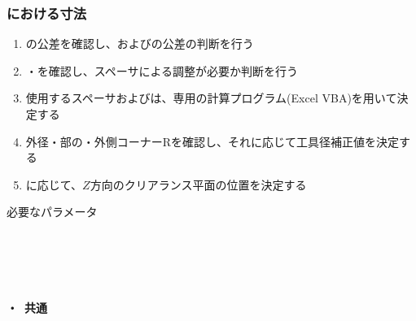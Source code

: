 \subsubsection{\EndFacecut における寸法}
\begin{enumerate}[label=\sarrow]
\item {}\nameWorkTotalLength の公差を確認し、\TopAlocationLength および\BottomAlocationLength の公差の判断を行う
\item \TopAlocationLength・\BottomAlocationLength を確認し、スペーサによる調整が必要か判断を行う
\item 使用するスペーサおよび\ReAlocationLength は、専用の計算プログラム(Excel VBA)を用いて決定する
\item {}外径・\nameEndFace 部の\nameThickness・\nameEndFace 外側コーナーRを確認し、それに応じて工具径補正値を決定する
\item \ReAlocationLength に応じて、$Z$方向のクリアランス平面の位置を決定する
\end{enumerate}
\begin{Parameter}{必要なパラメータ}
\paragraph*{\ReAlocationLength}
\PMWorkTotalLength
\PMTopAlocationLength
\PMBottomAlocationLength
\PMACOD
\PMJigLength
{}
\tcbline*
\paragraph*{\TopEndFacecut}
\PMTopReAlocationLength
\PMACOD
\PMBDOD
\PMODCornerR\\
\PMTopEndACID
\PMTopEndBDID
{}
\tcbline*
\paragraph*{\BottomEndFacecut}
\PMBottomReAlocationLength
\PMACOD
\PMBDOD
\PMODCornerR\\
\PMBottomEndACID
\PMBottomEndBDID
{}
\tcbline*
\paragraph*{\TopEndFacecut・\BottomEndFacecut~共通}
\end{Parameter}


